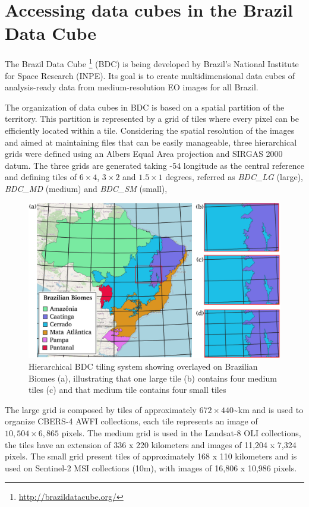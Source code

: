 \documentclass[a4paper,]{tufte-book}
\begin{document}
\hypertarget{accessing-data-cubes-in-the-brazil-data-cube}{%
\section{Accessing data cubes in the Brazil Data Cube}\label{accessing-data-cubes-in-the-brazil-data-cube}}

The Brazil Data Cube \footnote{ \url{http://brazildatacube.org/} } (BDC) is being developed by Brazil's National Institute for Space Research (INPE). Its goal is to create multidimensional data cubes of analysis-ready data from medium-resolution EO images for all Brazil.

The organization of data cubes in BDC is based on a spatial partition of the territory. This partition is represented by a grid of tiles where every pixel can be efficiently located within a tile. Considering the spatial resolution of the images and aimed at maintaining files that can be easily manageable, three hierarchical grids were defined using an Albers Equal Area projection and SIRGAS 2000 datum. The three grids are generated taking -54 longitude as the central reference and defining tiles of \(6\times4\), \(3\times2\) and \(1.5\times1\) degrees, referred as \emph{BDC\_LG} (large), \emph{BDC\_MD} (medium) and \emph{BDC\_SM} (small),

\begin{figure}

{\centering \includegraphics[width=0.5\linewidth,height=0.5\textheight]{images/bdc_grid} 

}

\caption[Hierarchical BDC tiling system showing overlayed on Brazilian Biomes (a), illustrating that one large tile (b) contains four medium tiles (c) and that medium tile contains four small tiles]{Hierarchical BDC tiling system showing overlayed on Brazilian Biomes (a), illustrating that one large tile (b) contains four medium tiles (c) and that medium tile contains four small tiles}\label{fig:unnamed-chunk-19}
\end{figure}

The large grid is composed by tiles of approximately \(672\times440\)\textasciitilde km and is used to organize CBERS-4 AWFI collections, each tile represents an image of \(10,504\times6,865\) pixels. The medium grid is used in the Landsat-8 OLI collections, the tiles have an extension of 336 x 220 kilometers and images of 11,204 x 7,324 pixels. The small grid present tiles of approximately 168 x 110 kilometers and is used on Sentinel-2 MSI collections (10m), with images of 16,806 x 10,986 pixels.
\end{document}

